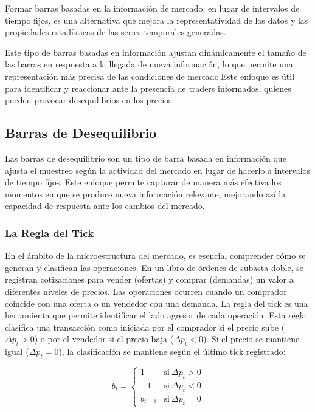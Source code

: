 \documentclass[a4paper,12pt]{report}
\begin{document}
Formar barras basadas en la información de mercado, en lugar de intervalos de tiempo fijos, 
es una alternativa que mejora la representatividad de los datos y las propiedades estadísticas 
de las series temporales generadas. 

Este tipo de barras basadas en información ajustan dinámicamente el tamaño de las barras
en respuesta a la llegada de nueva información, lo que permite una representación
más precisa de las condiciones de mercado.Este enfoque es útil para identificar y reaccionar 
ante la presencia de traders
informados, quienes pueden provocar desequilibrios en los precios.

\subsection{Barras de Desequilibrio}

Las barras de desequilibrio son un tipo de barra basada en información que ajusta el muestreo 
según la actividad del mercado en lugar de hacerlo a intervalos de tiempo fijos. Este enfoque 
permite capturar de manera más efectiva los momentos en que se produce nueva información relevante, 
mejorando así la capacidad de respuesta ante los cambios del mercado.

\subsubsection{La Regla del Tick}

En el ámbito de la microestructura del mercado, es esencial comprender cómo se generan y clasifican las operaciones. En un 
libro de órdenes de subasta doble, se registran cotizaciones para vender (ofertas) y comprar (demandas) un valor a diferentes 
niveles de precios. Las operaciones ocurren cuando un comprador coincide con una oferta o un vendedor con una demanda. La regla 
del tick es una herramienta que permite identificar el lado agresor de cada operación. Esta regla clasifica una transacción 
como iniciada por el comprador si el precio sube (\(\Delta p_t > 0\)) o por el vendedor si el precio baja (\(\Delta p_t < 0\)). 
Si el precio se mantiene igual (\(\Delta p_t = 0\)), la clasificación se mantiene según el último tick registrado:

\begin{equation}
b_t =
\begin{cases}
1 & \text{si} \ \Delta p_t > 0 \\
-1 & \text{si} \ \Delta p_t < 0 \\
b_{t-1} & \text{si} \ \Delta p_t = 0
\end{cases}
\end{equation}
\end{document}
